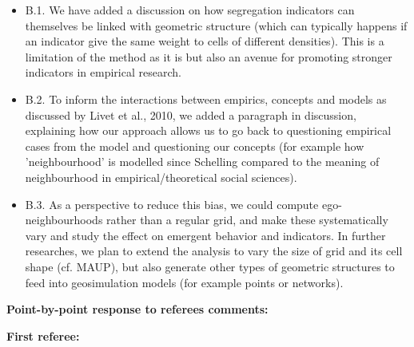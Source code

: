 \documentclass[11pt,a4paper,sans]{moderncv}        %
\begin{document}
 \begin{itemize}
 
  \item B.1. We have added a discussion on how segregation indicators can themselves be linked with geometric structure (which can typically happens if an indicator give the same weight to cells of different densities). This is a limitation of the method as it is but also an avenue for promoting stronger indicators in empirical research. %

  
  \item B.2. To inform the interactions between empirics, concepts and models as discussed by Livet et al., 2010, we added a paragraph in discussion, explaining how our approach allows us to go back to questioning empirical cases from the model and questioning our concepts (for example how 'neighbourhood' is modelled since Schelling compared to the meaning of neighbourhood in empirical/theoretical social sciences).
  
  \item B.3. As a perspective to reduce this bias, we could compute ego-neighbourhoods rather than a regular grid, and make these systematically vary and study the effect on emergent behavior and indicators. In further researches, we plan to extend the analysis to vary the size of grid and its cell shape (cf. MAUP), but also generate other types of geometric structures to feed into geosimulation models (for example points or networks).
\end{itemize}

\bigskip


\medskip
\textbf{Point-by-point response to referees comments:}

\medskip

\textbf{First referee:}

\medskip

\end{document}
